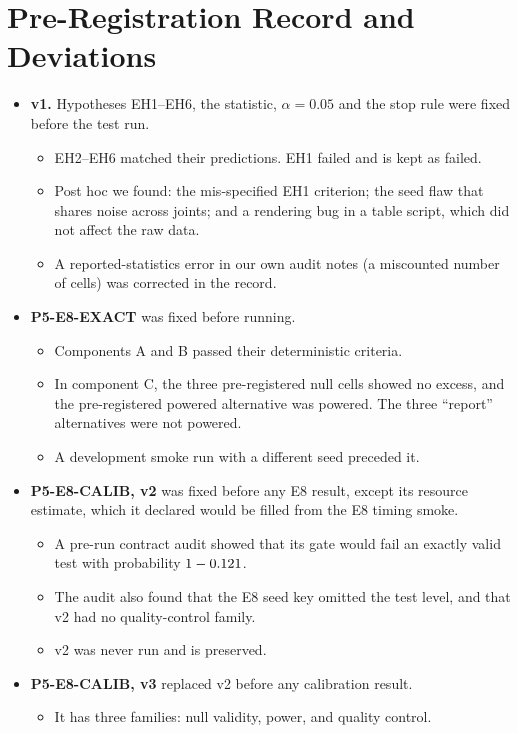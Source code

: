 \documentclass{article}
\theoremstyle{plain}
\theoremstyle{definition}
\theoremstyle{remark}
\begin{document}
\section{Pre-Registration Record and Deviations}
\label{app:prereg}
\begin{itemize}
\item \textbf{v1.} Hypotheses EH1--EH6, the statistic, $\alpha=0.05$ and the stop rule were fixed before the test run.
  \begin{itemize}
  \item EH2--EH6 matched their predictions. EH1 failed and is kept as failed.
  \item Post hoc we found: the mis-specified EH1 criterion; the seed flaw that shares noise across joints; and a rendering bug in a table script, which did not affect the raw data.
  \item A reported-statistics error in our own audit notes (a miscounted number of cells) was corrected in the record.
  \end{itemize}
\item \textbf{P5-E8-EXACT} was fixed before running.
  \begin{itemize}
  \item Components A and B passed their deterministic criteria.
  \item In component C, the three pre-registered null cells showed no excess, and the pre-registered powered alternative was powered. The three ``report'' alternatives were not powered.
  \item A development smoke run with a different seed preceded it.
  \end{itemize}
\item \textbf{P5-E8-CALIB, v2} was fixed before any E8 result, except its resource estimate, which it declared would be filled from the E8 timing smoke.
  \begin{itemize}
  \item A pre-run contract audit showed that its gate would fail an exactly valid test with probability $1-0.121$.
  \item The audit also found that the E8 seed key omitted the test level, and that v2 had no quality-control family.
  \item v2 was never run and is preserved.
  \end{itemize}
\item \textbf{P5-E8-CALIB, v3} replaced v2 before any calibration result.
  \begin{itemize}
  \item It has three families: null validity, power, and quality control.

\end{itemize}
\end{itemize}
\end{document}
